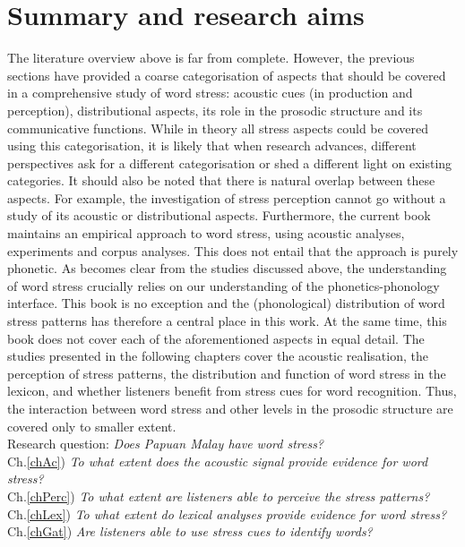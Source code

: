 \section{Summary and research aims} \label{secRQ}
The literature overview above is far from complete. However, the previous sections have provided a coarse categorisation of aspects that should be covered in a comprehensive study of word stress: acoustic cues (in production and perception), distributional aspects, its role in the prosodic structure and its communicative functions. While in theory all stress aspects could be covered using this categorisation, it is likely that when research advances, different perspectives ask for a different categorisation or shed a different light on existing categories. It should also be noted that there is natural overlap between these aspects. For example, the investigation of stress perception cannot go without a study of its acoustic or distributional aspects. Furthermore, the current book maintains an empirical approach to word stress, using acoustic analyses, experiments and corpus analyses. This does not entail that the approach is purely phonetic. As becomes clear from the studies discussed above, the understanding of word stress crucially relies on our understanding of the phonetics-phonology interface. This book is no exception and the (phonological) distribution of word stress patterns has therefore a central place in this work. At the same time, this book does not cover each of the aforementioned aspects in equal detail. The studies presented in the following chapters cover the acoustic realisation, the perception of stress patterns, the distribution and function of word stress in the lexicon, and whether listeners benefit from stress cues for word recognition. Thus, the interaction between word stress and other levels in the prosodic structure are covered only to smaller extent.\\

\noindent Research question: \textit{Does Papuan Malay have word stress?}\\

\noindent Ch.\ref{chAc}) \textit{To what extent does the acoustic signal provide evidence for word stress?} \\
Ch.\ref{chPerc}) \textit{To what extent are listeners able to perceive the stress patterns?}\\
Ch.\ref{chLex}) \textit{To what extent do lexical analyses provide evidence for word stress?}\\
Ch.\ref{chGat}) \textit{Are listeners able to use stress cues to identify words?}\\

